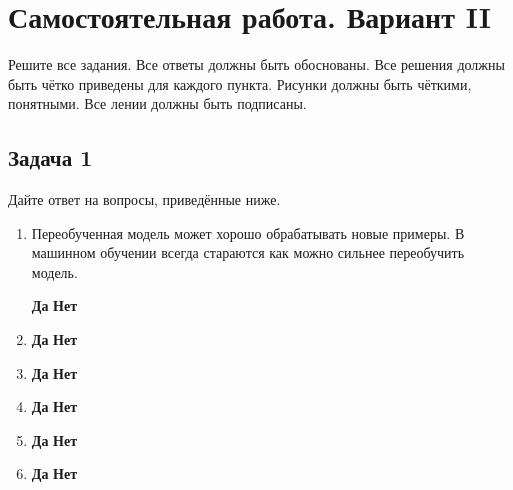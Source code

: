 \documentclass[12pt, a4paper, oneside]{article}
\begin{document}
\newpage 

\section*{Самостоятельная работа. Вариант II}

Решите все задания. Все ответы должны быть обоснованы. Все решения должны быть чётко приведены для каждого пункта. Рисунки должны быть чёткими, понятными. Все лении должны быть подписаны. 

\subsection*{Задача 1 }

Дайте ответ на вопросы, приведённые ниже. 

\begin{enumerate}
	\item  Переобученная модель может хорошо обрабатывать новые примеры. В машинном обучении всегда стараются как можно сильнее переобучить модель.
	
	\hspace{2cm} \textbf{Да}  \hspace{4cm} \textbf{Нет} 
	
	\item 
	
	\hspace{2cm} \textbf{Да}  \hspace{4cm} \textbf{Нет} 
	
	\item 
	
	\hspace{2cm} \textbf{Да}  \hspace{4cm} \textbf{Нет} 
	
	\item 	
	
	\hspace{2cm} \textbf{Да}  \hspace{4cm} \textbf{Нет} 
	
	\item 
	
	\hspace{2cm} \textbf{Да}  \hspace{4cm} \textbf{Нет} 
	
	\item 
	
	\hspace{2cm} \textbf{Да}  \hspace{4cm} \textbf{Нет} 
	

\end{enumerate}
\end{document}
